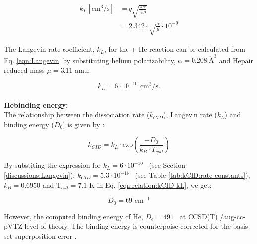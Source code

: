 \begin{equation}
    \begin{split}
        k_L [\text{cm}^3 / \text{s}] & = q \sqrt{\frac{\pi \alpha}{\epsilon _0 \mu}} \\
        &= 2.342 \cdot \sqrt{ \frac{\alpha}{\mu}} \cdot 10^{-9} 
   \end{split}
   \label{eqn:Langevin}
\end{equation}


The Langevin rate coefficient, $k_L$, for the \CD + He reaction can be calculated from Eq. \ref{eqn:Langevin} by substituting helium polarizability, $\alpha=0.208\  \mathring{\text{A}}^3$ \cite{olney_absolute_1997} and He\CD pair reduced mass $\mu=3.11$ amu:

\begin{equation}
        k_L = 6 \cdot 10^{-10} \text{ cm}^3 / \text{s}.
   \label{eqn:Langevin-CD+}
\end{equation}
\\
\textbf{He\CD binding energy:}\\

The relationship between the dissociation rate ($k_{CID}$), Langevin rate ($k_L$) and binding energy ($D_0$) is given by \cite{SGA2015}:

\begin{equation}
    k_{CID} = k_L \cdot \text{exp} \left( \frac{-D_0}{k_B \cdot T_{coll}} \right)
    \label{eqn:relation:kCID-kL} 
\end{equation}

By substiting the expression for $k_L=6 \cdot 10^{-10}$ \pers\ (see Section \ref{discussions:Langevin}), 
$k_{CID}=5.3 \cdot 10^{-16}$ \pers\ (see Table \ref{tab:kCID:rate-constants}), $k_B=0.6950$ \wnn 
and T$_{coll}=7.1$ K in Eq. \ref{eqn:relation:kCID-kL}, we get:

\begin{equation}
    D_0 = 69 \text{ cm}^{-1}
\end{equation}

However, the computed binding energy of He\CD, $D_e=491$ \wn\ at CCSD(T) /aug-cc-pVTZ level of theory. The binding energy is counterpoise corrected for the basis set superposition error \cite{boys_calculation_1970}.
\label{discussions:binding-energy:CD+}
